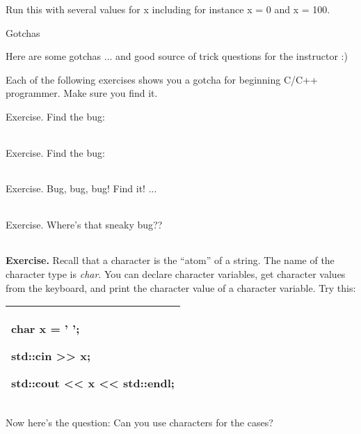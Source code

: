 \documentclass[
]{article}
\begin{document}
Run this with several values for x including for instance x = 0 and x =
100.

Gotchas

Here are some gotchas ... and good source of trick questions for the
instructor :)

Each of the following exercises shows you a gotcha for beginning C/C++
programmer. Make sure you find it.

Exercise. Find the bug:

\begin{longtable}[]{@{}@{}}
\toprule
\endhead
\bottomrule
\end{longtable}

Exercise. Find the bug:

\begin{longtable}[]{@{}@{}}
\toprule
\endhead
\bottomrule
\end{longtable}

Exercise. Bug, bug, bug! Find it! ...

\begin{longtable}[]{@{}@{}}
\toprule
\endhead
\bottomrule
\end{longtable}

Exercise. Where's that sneaky bug??

\begin{longtable}[]{@{}@{}}
\toprule
\endhead
\bottomrule
\end{longtable}

\textbf{Exercise.} Recall that a character is the ``atom'' of a string.
The name of the character type is \emph{char}. You can declare character
variables, get character values from the keyboard, and print the
character value of a character variable. Try this:

\begin{longtable}[]{@{}l@{}}
\toprule
\endhead
\begin{minipage}[t]{0.97\columnwidth}\raggedright
char x = ' ';

std::cin \textgreater\textgreater{} x;

std::cout \textless\textless{} x \textless\textless{} std::endl;\strut
\end{minipage}\tabularnewline
\bottomrule
\end{longtable}

Now here's the question: Can you use characters for the cases?
\end{document}
